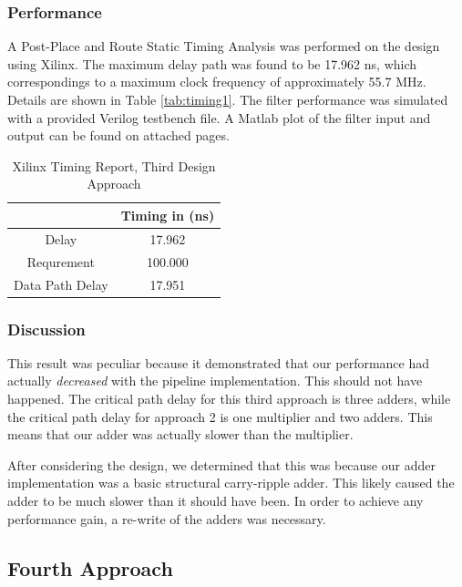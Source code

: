 \subsubsection*{Performance}
A Post-Place and Route Static Timing Analysis was performed on the design using Xilinx. The maximum delay path was found to be 17.962 ns, which correspondings to a maximum clock frequency of approximately 55.7 MHz. Details are shown in Table \ref{tab:timing1}. The filter performance was simulated with a provided Verilog testbench file. A Matlab plot of the filter input and output can be found on attached pages.

\begin{table}[h]
\begin{center}
\caption{Xilinx Timing Report, Third Design Approach} 
\begin{tabular}{c|c}
           & Timing in (ns) \\
\hline
     Delay &  17.962   \\

Requrement &      100.000  \\

Data Path Delay &   17.951  \\
\end{tabular}
\end{center}
\label{tab:timing3}
\end{table}

\subsubsection*{Discussion}
This result was peculiar because it demonstrated that our performance had actually \emph{decreased} with the pipeline implementation. This should not have happened. The critical path delay for this third approach is three adders, while the critical path delay for approach 2 is one multiplier and two adders. This means that our adder was actually slower than the multiplier.

After considering the design, we determined that this was because our adder implementation was a basic structural carry-ripple adder. This likely caused the adder to be much slower than it should have been. In order to achieve any performance gain, a re-write of the adders was necessary.


\subsection*{Fourth Approach}
